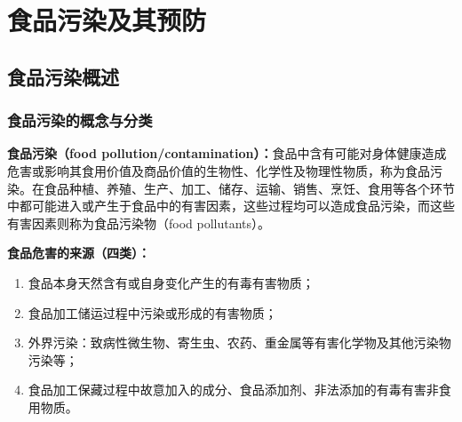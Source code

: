 \chapter{食品污染及其预防}

\section{食品污染概述}

\subsection{食品污染的概念与分类}

\begin{keybox}
\textbf{食品污染（food pollution/contamination）：}食品中含有可能对身体健康造成危害或影响其食用价值及商品价值的生物性、化学性及物理性物质，称为食品污染。在食品种植、养殖、生产、加工、储存、运输、销售、烹饪、食用等各个环节中都可能进入或产生于食品中的有害因素，这些过程均可以造成食品污染，而这些有害因素则称为食品污染物（food pollutants）。

\textbf{食品危害的来源（四类）：}
\begin{enumerate}[leftmargin=*]
    \item 食品本身天然含有或自身变化产生的有毒有害物质；
    \item 食品加工储运过程中污染或形成的有害物质；
    \item 外界污染：致病性微生物、寄生虫、农药、重金属等有害化学物及其他污染物污染等；
    \item 食品加工保藏过程中故意加入的成分、食品添加剂、非法添加的有毒有害非食用物质。
\end{enumerate}
\end{keybox}

